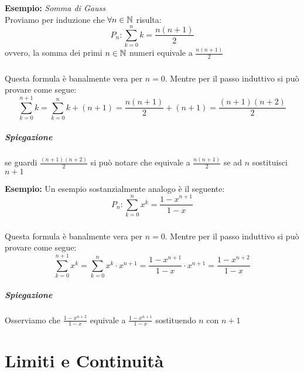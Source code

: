 \documentclass[12pt, a4paper, openany]{book}
\newcommand{\esempio}[1]{\begin{box_esempio} \textbf{Esempio: }#1\end{box_esempio}}
\begin{document}
\esempio{ \emph{Somma di Gauss}\\
    Proviamo per induzione che $\forall n\in\mathbb{N}$ risulta:
    \begin{equation*}
        P_n: \sum_{k=0}^n k= \frac{n(n+1)}{2}
    \end{equation*}
    ovvero, la somma dei primi $n \in\mathbb{N}$ numeri equivale a $\frac{n(n+1)}{2}$
    \paragraph*{}Questa formula è banalmente vera per $n=0$.
    Mentre per il passo induttivo si può provare come segue:
    \begin{equation*}
        \sum_{k=0}^{n+1} k = \sum_{k=0}^{n} k + (n+1) = \frac{n(n+1)}{2} + (n+1) = \frac{(n+1)(n+2)}{2} 
    \end{equation*}
    \paragraph*{Spiegazione}
    se guardi $\frac{(n+1)(n+2)}{2}$ si può notare che equivale a $\frac{n(n+1)}{2}$ se ad $n$ sostituisci $n+1$
}

\esempio{
    Un esempio sostanzialmente analogo è il seguente:\\
    \begin{equation*}
        P_n: \sum_{k=0}^n x^k = \frac{1-x^{n+1}}{1-x}
    \end{equation*}
    \paragraph*{}Questa formula è banalmente vera per $n=0$.
    Mentre per il passo induttivo si può provare come segue:
    \begin{equation*}
        \sum_{k=0}^{n+1} x^k = \sum_{k=0}^n x^k \cdot x^{n+1} = \frac{1-x^{n+1}}{1-x}\cdot x^{n+1} = \frac{1-x^{n+2}}{1-x}
    \end{equation*}
    \paragraph*{Spiegazione} Osserviamo che $\frac{1-x^{n+2}}{1-x}$ equivale a $\frac{1-x^{n+1}}{1-x}$ sostituendo $n$ con $n+1$
}

\chapter{Limiti e Continuità}
\end{document}
